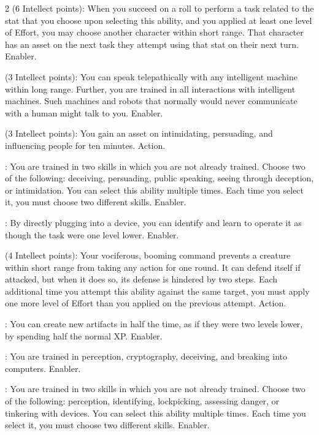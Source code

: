 \begin{multicols}{2}
 (6 Intellect points): When you succeed on a roll to perform a task related to the stat that you choose upon selecting this ability, and you applied at least one level of Effort, you may choose another character within short range. That character has an asset on the next task they attempt using that stat on their next turn. Enabler. 
 
 (3 Intellect points): You can speak telepathically with any intelligent machine within long range. Further, you are trained in all interactions with intelligent machines. Such machines and robots that normally would never communicate with a human might talk to you. Enabler. 
 
 (3 Intellect points): You gain an asset on intimidating, persuading, and influencing people for ten minutes. Action. 
 
: You are trained in two skills in which you are not already trained. Choose two of the following: deceiving, persuading, public speaking, seeing through deception, or intimidation. You can select this ability multiple times. Each time you select it, you must choose two different skills. Enabler. 
 
: By directly plugging into a device, you can identify and learn to operate it as though the task were one level lower. Enabler. 
 
 (4 Intellect points): Your vociferous, booming command prevents a creature within short range from taking any action for one round. It can defend itself if attacked, but when it does so, its defense is hindered by two steps. Each additional time you attempt this ability against the same target, you must apply one more level of Effort than you applied on the previous attempt. Action. 
 
: You can create new artifacts in half the time, as if they were two levels lower, by spending half the normal XP. Enabler. 
 
: You are trained in perception, cryptography, deceiving, and breaking into computers. Enabler. 
 
: You are trained in two skills in which you are not already trained. Choose two of the following: perception, identifying, lockpicking, assessing danger, or tinkering with devices. You can select this ability multiple times. Each time you select it, you must choose two different skills. Enabler. 
 

\end{multicols}
